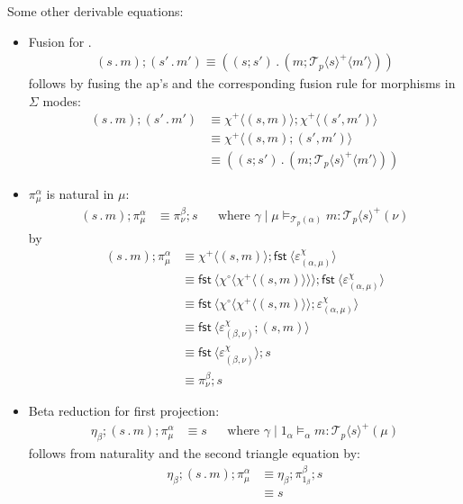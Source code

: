 \documentclass[10pt]{article}
\theoremstyle{definition}
\newcommand\dsd[1]{\ensuremath{\mathsf{#1}}}
\newcommand{\app}[2]{\ensuremath{#1 \: #2}}
\newcommand{\fst}[1]{\app{\dsd{fst}}{#1}}
\newcommand\TermTwoT[5]{\ensuremath{#1 \mid #3 \vDash_{#5} {#2} : #4}}
\newcommand\TrPlus[2]{\ensuremath{{#1}^+(#2)}}
\newcommand\El[2]{\mathcal{T}_{#1}(#2)}
\newcommand\ApEl[2]{\mathcal{T}_{#1}\langle#2\rangle}
\newcommand\bdot[0]{\mathbin{.}}
\newcommand\ap[2]{\ensuremath{#1 \langle #2 \rangle }}
\newcommand\ApPlus[2]{\ensuremath{{#1}^+ \langle #2 \rangle }}
\newcommand\ApCirc[2]{\ensuremath{{#1}^\circ \langle #2 \rangle }}
\begin{document}
Some other derivable equations:
\begin{itemize}
\item Fusion for $.$
\begin{align}
\label{dot-fusion}
    (s \bdot m);(s' \bdot m') \equiv ((s;s') \bdot (m;\ApPlus{\ApEl{p}{s}} {m'}))
\end{align}
follows by fusing the ap's and the corresponding fusion rule for morphisms in $\Sigma$ modes:
\begin{align*}
(s \bdot m);(s' \bdot m') &\equiv \ApPlus{\chi}{(s, m)} ; \ApPlus{\chi}{(s', m')} \\
&\equiv \ApPlus{\chi}{(s, m);(s', m')} \\
&\equiv ((s;s') \bdot (m;\ApPlus{\ApEl{p}{s}} {m'}))
\end{align*}

\item $\pi^\alpha_\mu$ is natural in $\mu$:
  \begin{align}
  \label{pi-naturality}
  (s \bdot m); \pi^\alpha_\mu &\equiv \pi^\beta_\nu;s && \text{where } \TermTwoT{\gamma}{m}{\mu}{\TrPlus{\ApEl{p}{s}}{\nu}}{\El{p}{\alpha}}
  \end{align}
  by
  \begin{align*}
  (s \bdot m); \pi^\alpha_\mu 
  &\equiv \ApPlus{\chi}{(s, m)} ; \ap \fst {\varepsilon^\chi_{(\alpha, \mu)}} \\  
  &\equiv \ap{\fst}{\ApCirc{\chi}{\ApPlus{\chi}{(s, m)}}} ; \ap \fst {\varepsilon^\chi_{(\alpha, \mu)}} \\
  &\equiv \ap{\fst}{\ApCirc{\chi}{\ApPlus{\chi}{(s, m)}} ; \varepsilon^\chi_{(\alpha, \mu)}}  \\
  &\equiv \ap{\fst}{\varepsilon^\chi_{(\beta, \nu)}; (s, m) } \\
  &\equiv \ap{\fst}{\varepsilon^\chi_{(\beta, \nu)}} ; s\\
  &\equiv \pi^\beta_\nu ; s
  \end{align*}

\item Beta reduction for first projection:
  \begin{align}
\label{beta-pi}
\eta_\beta;(s \bdot m);\pi^\alpha_\mu &\equiv s && \text{where } \TermTwoT{\gamma}{m}{1_\alpha}{\TrPlus{\ApEl{p}{s}}{\mu}}{\alpha}
  \end{align}
follows from naturality and the second triangle equation by:
\begin{align*}
\eta_\beta;(s \bdot m);\pi^\alpha_\mu
&\equiv \eta_\beta;\pi^\beta_{1_\beta};s \\
&\equiv s
\end{align*}


\end{itemize}
\end{document}
